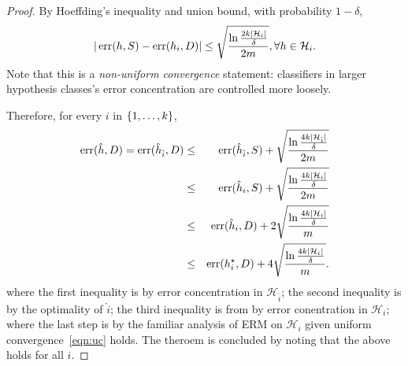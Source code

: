 \documentclass{article}
\DeclareMathOperator*{\err}{{\rm err}}
\newcommand{\Hcal}{\mathcal{H}}
\begin{document}
\begin{proof}
By Hoeffding's inequality and union bound, with probability $1-\delta$,
\begin{equation}
   |\err(h, S) - \err(h_i, D)| \leq \sqrt{\frac{\ln\frac{2k|\Hcal_i|}{\delta}}{2m}}, \forall h \in \Hcal_i.
   \label{eqn:uc}
 \end{equation}
 Note that this is a {\em non-uniform convergence} statement: classifiers in larger
 hypothesis classes's error concentration are controlled more loosely.

Therefore, for every $i$ in $\cbr{1,\ldots,k}$,
\begin{eqnarray*}
\err(\hat{h}, D) = \err(\hat{h}_{\hat{i}}, D) &\leq& \err(\hat{h}_{\hat{i}}, S) + \sqrt{\frac{\ln\frac{4k|\Hcal_{\hat{i}}|}{\delta}}{2m}} \\
&\leq& \err(\hat{h}_i, S) + \sqrt{\frac{\ln\frac{4k|\Hcal_i|}{\delta}}{2m}} \\
&\leq& \err(\hat{h}_i, D) + 2\sqrt{\frac{\ln\frac{4k|\Hcal_i|}{\delta}}{m}} \\
&\leq& \err(h_i^\star, D) + 4\sqrt{\frac{\ln\frac{4k|\Hcal_i|}{\delta}}{m}}.
\end{eqnarray*}
where the first inequality is by error concentration in $\Hcal_{\hat{i}}$;
the second inequality is by the optimality of $\hat{i}$;
the third inequality is from by error conentration in $\Hcal_i$;
where the last step is by the familiar analysis of ERM on $\Hcal_i$ given uniform convergence~\eqref{eqn:uc} holds.
The theroem is concluded by noting that the above holds for all $i$.
\end{proof}



\end{document}
